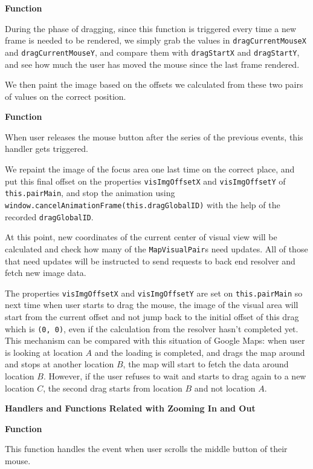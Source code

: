 \textbf{Function} 

During the phase of dragging, since this function is triggered every time a new frame is needed to be rendered, we simply grab the values in \texttt{dragCurrentMouseX} and \texttt{dragCurrentMouseY}, and compare them with \texttt{dragStartX} and \texttt{dragStartY}, and see how much the user has moved the mouse since the last frame rendered.

We then paint the image based on the offsets we calculated from these two pairs of values on the correct position.

\textbf{Function} 

When user releases the mouse button after the series of the previous events, this handler gets triggered.

We repaint the image of the focus area one last time on the correct place, and put this final offset on the properties \texttt{visImgOffsetX} and \texttt{visImgOffsetY} of \texttt{this.pairMain}, and stop the animation using \texttt{window.cancelAnimationFrame(this.dragGlobalID)} with the help of the recorded \texttt{dragGlobalID}.

At this point, new coordinates of the current center of visual view will be calculated and check how many of the \texttt{MapVisualPair}s need updates. All of those that need updates will be instructed to send requests to back end resolver and fetch new image data.

The properties \texttt{visImgOffsetX} and \texttt{visImgOffsetY} are set on \texttt{this.pairMain} so next time when user starts to drag the mouse, the image of the visual area will start from the current offset and not jump back to the initial offset of this drag which is \texttt{(0, 0)}, even if the calculation from the resolver hasn't completed yet. This mechanism can be compared with this situation of Google Maps: when user is looking at location $A$ and the loading is completed, and drags the map around and stops at another location $B$, the map will start to fetch the data around location $B$. However, if the user refuses to wait and starts to drag again to a new location $C$, the second drag starts from location $B$ and not location $A$.

\textbf{Handlers and Functions Related with Zooming In and Out}

\textbf{Function} 

This function handles the event when user scrolls the middle button of their mouse.

